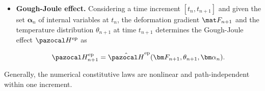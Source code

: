 \begin{itemize}
    \item \textbf{Gough-Joule effect.}
 Considering a time increment $[t_n, t_{n+1}]$ and given the set $\bm \alpha_n$ of internal variables at $t_n$, the deformation gradient $\mat F_{n+1}$ and the temperature distribution \(\theta_{n+1}\) at time $t_{n+1}$ determines the Gough-Joule effect \(\pazocal H^\text{ep}\) as
    \begin{highlight}
    \begin{equation}
    \pazocal H^\text{ep}_{n+1} = \hat{\pazocal H}^\text{ep}(\bm F_{n+1}, \theta_{n+1}, \bm \alpha_n).
    \end{equation}
    \end{highlight}
\end{itemize}
Generally, the numerical constitutive laws are nonlinear and path-independent within one increment.

